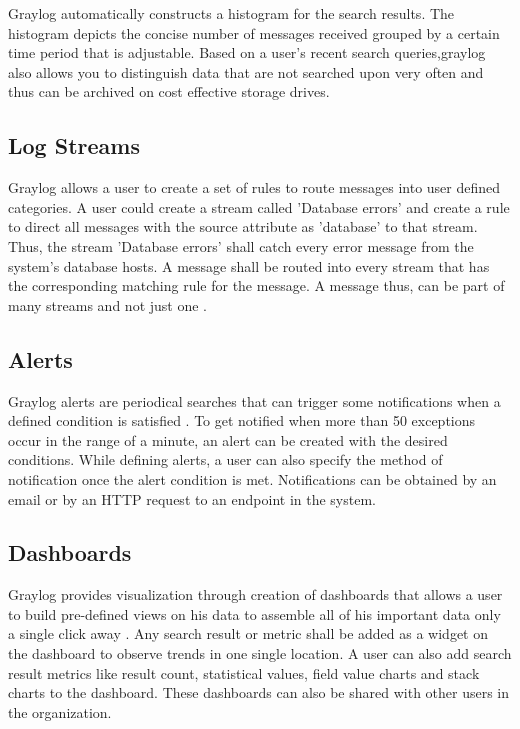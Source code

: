 \documentclass[9pt,twocolumn,twoside]{../../styles/osajnl}
\begin{document}
Graylog automatically constructs a histogram for the search
results. The histogram depicts the concise number of messages received
grouped by a certain time period that is adjustable.  Based on a
user’s recent search queries,graylog also allows you to distinguish
data that are not searched upon very often and thus can be archived on
cost effective storage drives.

\subsection{Log Streams}

Graylog allows a user to create a set of rules to route messages into
user defined categories. A user could create a stream called 'Database
errors' and create a rule to direct all messages with the source
attribute as 'database' to that stream. Thus, the stream 'Database
errors' shall catch every error message from the system's database
hosts. A message shall be routed into every stream that has the
corresponding matching rule for the message. A message thus, can be
part of many streams and not just one \cite{www-graylog-streams}.

\subsection{Alerts}

Graylog alerts are periodical searches that can trigger some
notifications when a defined condition is satisfied
\cite{www-graylog-alerts}. To get notified when more than 50
exceptions occur in the range of a minute, an alert can be created
with the desired conditions.  While defining alerts, a user can also
specify the method of notification once the alert condition is
met. Notifications can be obtained by an email or by an HTTP request
to an endpoint in the system.

\subsection{Dashboards}

Graylog provides visualization through creation of dashboards that
allows a user to build pre-defined views on his data to assemble all
of his important data only a single click away
\cite{www-graylog-dashboards}. Any search result or metric shall be
added as a widget on the dashboard to observe trends in one single
location.  A user can also add search result metrics like result
count, statistical values, field value charts and stack charts to the
dashboard. These dashboards can also be shared with other users in the
organization.
\end{document}
